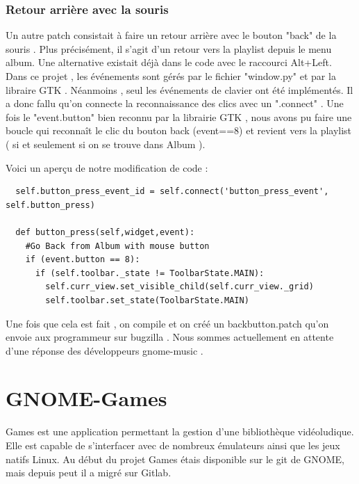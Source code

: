 \documentclass[12pt]{report}
\begin{document}
\subsection{Retour arrière avec la souris}
Un autre patch consistait à faire un retour arrière avec le bouton "back" de la souris . Plus précisément, il s'agit d'un retour vers la playlist depuis le menu album.
Une alternative existait déjà dans le code avec le raccourci Alt+Left. Dans ce projet , les événements sont gérés par le fichier "window.py" et par la libraire GTK . Néanmoins , seul les événements de clavier ont été implémentés. Il a donc fallu qu'on connecte la reconnaissance des clics avec un ".connect" . Une fois le "event.button" bien reconnu par la librairie GTK , nous avons pu faire une boucle qui reconnaît le clic du bouton back (event==8) et revient vers la playlist ( si et seulement si on se trouve dans Album ).

Voici un aperçu de notre modification de code : 

\begin{verbatim}
  self.button_press_event_id = self.connect('button_press_event', self.button_press)

  def button_press(self,widget,event):
    #Go Back from Album with mouse button 
    if (event.button == 8):
      if (self.toolbar._state != ToolbarState.MAIN):
        self.curr_view.set_visible_child(self.curr_view._grid)
        self.toolbar.set_state(ToolbarState.MAIN)
\end{verbatim}

Une fois que cela est fait , on compile et on créé un backbutton.patch qu'on envoie aux programmeur sur bugzilla . 
Nous sommes actuellement en attente d'une réponse des développeurs gnome-music . 

\newpage
\chapter{GNOME-Games} %
Games est une application permettant la gestion d'une
bibliothèque vidéoludique. Elle est capable de s'interfacer avec de
nombreux émulateurs ainsi que les jeux natifs Linux. Au début du
projet Games étais disponible sur le git de GNOME, mais depuis peut il
a migré sur Gitlab.
\end{document}
